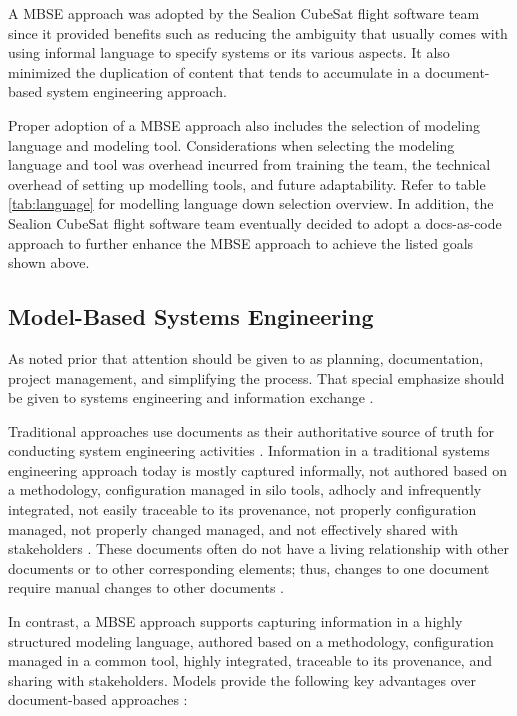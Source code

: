 \documentclass[journal,article,submit,pdftex,moreauthors]{Definitions/mdpi}
\begin{document}
A MBSE approach was adopted by the Sealion CubeSat flight software team since it provided benefits such as reducing the ambiguity that usually comes with using informal language to specify systems or its various aspects.  It also minimized the duplication of content that tends to accumulate in a document-based system engineering approach.

Proper adoption of a MBSE approach also includes the selection of modeling language and modeling tool.  Considerations when selecting the modeling language and tool was overhead incurred from training the team, the technical overhead of setting up modelling tools, and future adaptability.  Refer to table \ref{tab:language} for modelling language down selection overview.  In addition, the Sealion CubeSat flight software team eventually decided to adopt a docs-as-code approach to further enhance the MBSE approach to achieve the listed goals shown above.

\subsection{Model-Based Systems Engineering}
As noted prior that attention should be given to as planning, documentation, project management, and simplifying the process.  That special emphasize should be given to systems engineering and information exchange \cite{aalto}.

Traditional approaches use documents as their authoritative source of truth for conducting system engineering activities \cite{architecting_spacecraft}.  Information in a traditional systems engineering approach today is mostly captured informally, not authored based on a methodology, configuration managed in silo tools, adhocly and infrequently integrated, not easily traceable to its provenance, not properly configuration managed, not properly changed managed, and not effectively shared with stakeholders \cite{caesar_model_based_approach}.  These documents often do not have a living relationship with other documents or to other corresponding elements; thus, changes to one document require manual changes to other documents \cite{ibm_mbse}.

In contrast, a MBSE approach supports capturing information in a highly structured modeling language, authored based on a methodology, configuration managed in a common tool, highly integrated, traceable to its provenance, and sharing with stakeholders.  Models provide the following key advantages over document-based approaches \cite{ibm_mbse}: 
\end{document}

